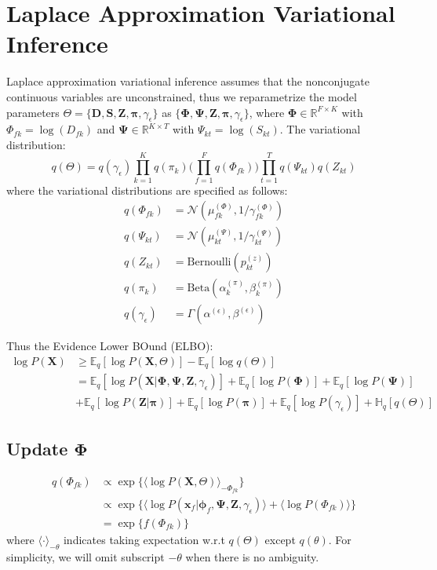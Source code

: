 \documentclass[11pt]{article} %
\begin{document}
\section{Laplace Approximation Variational Inference}
Laplace approximation variational inference assumes that the nonconjugate continuous variables are unconstrained, thus we reparametrize the model parameters $\Theta = \{\mathbf{D}, \mathbf{S}, \mathbf{Z}, \bm{\pi}, \gamma_\epsilon\}$ as $\{\mathbf{\Phi}, \mathbf{\Psi}, \mathbf{Z}, \bm{\pi}, \gamma_\epsilon\}$, where $\mathbf{\Phi} \in \mathbb{R}^{F\times K}$ with $\Phi_{fk} = \log(D_{fk})$ and $\mathbf{\Psi} \in \mathbb{R}^{K \times T}$ with $\Psi_{kt} = \log(S_{kt})$.
The variational distribution: 
\[
q(\Theta) = q(\gamma_\epsilon)\prod_{k=1}^K q(\pi_k) \biggl(\prod_{f=1}^F q(\Phi_{fk}) \biggl) \prod_{t=1}^T q(\Psi_{kt}) q(Z_{kt}) 
\]
where the variational distributions are specified as follows:
\begin{align*}
q(\Phi_{fk}) &= \mathcal{N}(\mu_{fk}^{(\Phi)}, 1/\gamma_{fk}^{(\Phi)})\\
q(\Psi_{kt}) &= \mathcal{N}(\mu_{kt}^{(\Psi)}, 1/\gamma_{kt}^{(\Psi)})\\
q(Z_{kt}) &= \textrm{Bernoulli}(p_{kt}^{(z)})\\
q(\pi_{k}) &= \textrm{Beta}(\alpha_k^{(\pi)}, \beta_k^{(\pi)})\\
q(\gamma_\epsilon) &= \Gamma(\alpha^{(\epsilon)}, \beta^{(\epsilon)})
\end{align*}

Thus the Evidence Lower BOund (ELBO):
\begin{align*}
\log P(\mathbf{X}) &\geq \mathbb{E}_q [\log P(\mathbf{X}, \Theta)] - \mathbb{E}_q [\log q(\Theta)]\\
&= \mathbb{E}_q [\log P(\mathbf{X} | \mathbf{\Phi}, \mathbf{\Psi}, \mathbf{Z}, \gamma_\epsilon)] + \mathbb{E}_q [\log P(\mathbf{\Phi})] + \mathbb{E}_q [\log P(\mathbf{\Psi})]\\
 &+ \mathbb{E}_q[\log P(\mathbf{Z} | \bm{\pi})] + \mathbb{E}_q[\log P(\bm{\pi})] + \mathbb{E}_q[\log P(\gamma_\epsilon)] + \mathbb{H}_q [q(\Theta)] 
\end{align*}


\subsection{Update $\mathbf{\Phi}$}\label{sec:phi}
\begin{align*}
q(\Phi_{fk}) &\propto \exp\{\langle\log P(\mathbf{X}, \Theta)\rangle_{-\Phi_{fk}}\}\\
&\propto \exp\{\langle \log P(\bm{x}_f | \bm{\phi}_f, \bm{\Psi}, \mathbf{Z}, \gamma_\epsilon)\rangle + \langle \log P(\Phi_{fk}) \rangle\}\\
&= \exp\{f(\Phi_{fk})\}
\end{align*}
where $\langle \cdot \rangle_{-\theta}$ indicates taking expectation w.r.t $q(\Theta)$ except $q(\theta)$. For simplicity, we will omit subscript $-\theta$ when there is no ambiguity.
\end{document}
